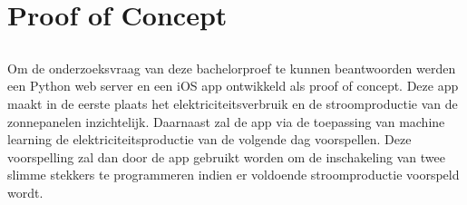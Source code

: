 
\chapter{Proof of Concept}%
\label{ch:Proof of Concept}


\section{}%
\label{sec:ontwikkeling mobiele app}

Om de onderzoeksvraag van deze bachelorproef te kunnen beantwoorden werden een Python web server en een  iOS app ontwikkeld als proof of concept. Deze app maakt in de eerste plaats het elektriciteitsverbruik en de stroomproductie van de zonnepanelen inzichtelijk. Daarnaast zal de app via de toepassing van machine learning de elektriciteitsproductie van de volgende dag voorspellen. Deze voorspelling zal dan door de app gebruikt worden om de inschakeling van twee slimme stekkers te programmeren indien er voldoende stroomproductie voorspeld wordt.

\subsection{}%
\label{sec:Digitale elektriciteitsmeter uitlezen}


